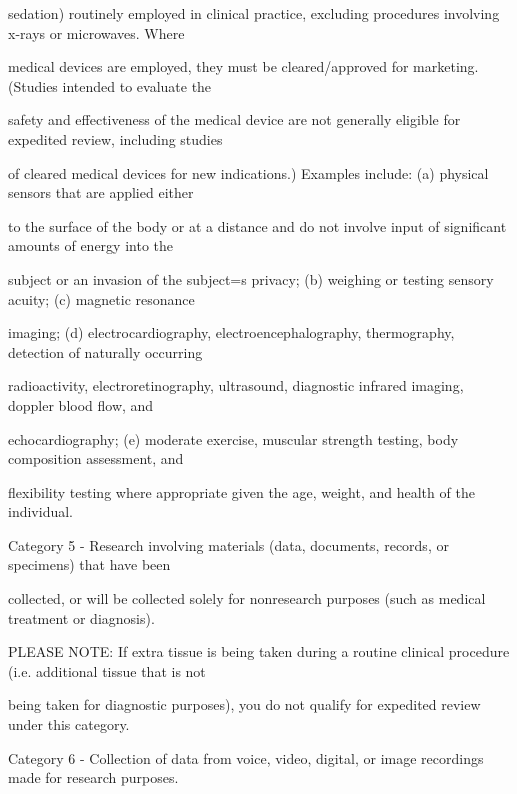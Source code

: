 \documentclass[10pt, letterpaper]{article}
\begin{document}
\begin{responsebox}

sedation) routinely employed in clinical practice, excluding procedures involving x-rays or microwaves. Where

medical devices are employed, they must be cleared/approved for marketing. (Studies intended to evaluate the

safety and effectiveness of the medical device are not generally eligible for expedited review, including studies

of cleared medical devices for new indications.) Examples include: (a) physical sensors that are applied either

to the surface of the body or at a distance and do not involve input of significant amounts of energy into the

subject or an invasion of the subject=s privacy; (b) weighing or testing sensory acuity; (c) magnetic resonance

imaging; (d) electrocardiography, electroencephalography, thermography, detection of naturally occurring

radioactivity, electroretinography, ultrasound, diagnostic infrared imaging, doppler blood flow, and

echocardiography; (e) moderate exercise, muscular strength testing, body composition assessment, and

flexibility testing where appropriate given the age, weight, and health of the individual.

\end{responsebox}

\noindent \makebox[0pt][l]{\color{columbiablue_official}$\boxtimes$}\hspace{1.2em} Category 5 - Research involving materials (data, documents, records, or specimens) that have been

\begin{responsebox}

collected, or will be collected solely for nonresearch purposes (such as medical treatment or diagnosis).

PLEASE NOTE: If extra tissue is being taken during a routine clinical procedure (i.e. additional tissue that is not

being taken for diagnostic purposes), you do not qualify for expedited review under this category.

\end{responsebox}

\noindent \makebox[0pt][l]{\color{columbiablue_official}$\boxtimes$}\hspace{1.2em} Category 6 - Collection of data from voice, video, digital, or image recordings made for research purposes.
\end{document}
